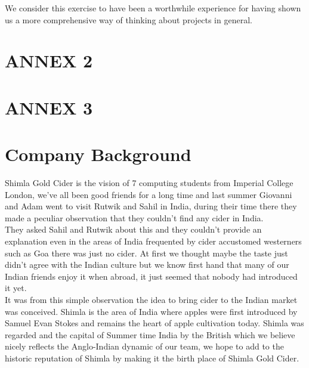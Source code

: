 \documentclass[11pt]{article}
\begin{document}
\noindent We consider this exercise to have been a worthwhile experience for having shown us a more comprehensive way of thinking about projects in general.

\newpage
\section{ANNEX 2}

\newpage
\section{ANNEX 3}
\newpage
\section{Company Background}
Shimla Gold Cider is the vision of 7 computing students from Imperial 
College London, we've all been good friends for a long time and last summer
Giovanni and Adam went to visit Rutwik and Sahil in India, during their time
there they made a peculiar observation that they couldn't find any cider in
India. \\

They asked Sahil and Rutwik about this and they couldn't provide an explanation
even in the areas of India frequented by cider accustomed westerners such as
Goa there was just no cider. At first we thought maybe the taste just didn't
agree with the Indian culture but we know first hand that many of our Indian
friends enjoy it when abroad, it just seemed that nobody had introduced it yet. \\

It was from this simple observation the idea to bring cider to the Indian market
was conceived. Shimla is the area of India where apples were first introduced by
Samuel Evan Stokes and remains the heart of apple cultivation today. Shimla was
regarded and the capital of Summer time India by the British which we believe
nicely reflects the Anglo-Indian dynamic of our team, we hope to add to the 
historic reputation of Shimla by making it the birth place of Shimla Gold Cider.
\newpage
\end{document}
